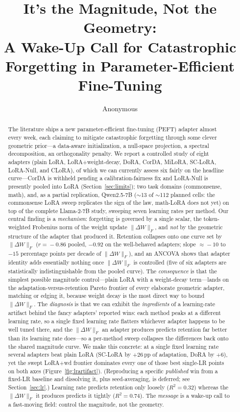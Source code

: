 \documentclass[11pt]{article}
\title{It's the Magnitude, Not the Geometry:\\
A Wake-Up Call for Catastrophic Forgetting in Parameter-Efficient Fine-Tuning}
\author{Anonymous}
\date{}
\newcommand{\dw}{\lVert\Delta W\rVert_F}
\begin{document}
\maketitle

\begin{abstract}
The literature ships a new parameter-efficient fine-tuning (PEFT) adapter almost
every week, each claiming to mitigate catastrophic forgetting through some clever
geometric prior---a data-aware initialization, a null-space projection, a spectral
decomposition, an orthogonality penalty. We report a controlled study of eight
adapters (plain LoRA, LoRA{+}weight-decay, DoRA, CorDA, MiLoRA, SC-LoRA, LoRA-Null,
and CLoRA), of which we can currently assess six fairly on the headline
curve---CorDA is withheld pending a calibration-fairness fix and LoRA-Null is presently
pooled into LoRA (Section~\ref{sec:limits}); two task domains
(commonsense, math), and, as a partial replication, Qwen2.5-7B
($\sim$13 of $\sim$112 planned cells: the commonsense LoRA sweep replicates the sign of
the law, math-LoRA does not yet) on top of the complete Llama-2-7B study, sweeping seven
learning rates per method. Our central finding is a \emph{mechanism}: forgetting is
governed by a single scalar, the token-weighted Frobenius norm of the weight update
$\dw$, and \emph{not} by the geometric structure of the adapter that produced it.
Retention collapses onto one curve set by $\dw$
($r\!=\!-0.86$ pooled, $-0.92$ on the well-behaved adapters; slope
$\approx\!-10$ to $-15$ percentage points per decade of $\dw$), and an ANCOVA shows
that adapter identity adds essentially nothing once $\dw$ is controlled (five of six
adapters are statistically indistinguishable from the pooled curve). The
\emph{consequence} is that the simplest possible magnitude control---plain LoRA with a
weight-decay term---lands on the adaptation-versus-retention Pareto frontier of
every elaborate geometric adapter, matching or edging it, because weight decay is the
most direct way to bound $\dw$. The \emph{diagnosis} is that we can exhibit the
\emph{ingredients} of a learning-rate artifact behind the fancy adapters' reported wins:
each method peaks at a different learning rate, so a single fixed learning rate flatters
whichever adapter happens to be well tuned there, and the $\dw$ an adapter produces
predicts retention far better than its learning rate does---so a per-method sweep
collapses the differences back onto the shared magnitude curve. We make this concrete:
at a single fixed learning rate several adapters beat plain LoRA (SC-LoRA by $+26$\,pp of
adaptation, DoRA by $+6$), yet the swept LoRA{+}wd frontier dominates every one of those
best single-LR points on both axes (Figure~\ref{fig:lrartifact}). (Reproducing a
specific \emph{published} win from a fixed-LR baseline and dissolving it, plus
seed-averaging, is deferred; see Section~\ref{sec:lr}.) Learning rate
predicts retention only loosely ($R^2\!=\!0.32$) whereas
the $\dw$ it produces predicts it tightly ($R^2\!=\!0.74$). The \emph{message} is a
wake-up call to a fast-moving field: control the magnitude, not the geometry.
\end{abstract}
\end{document}

